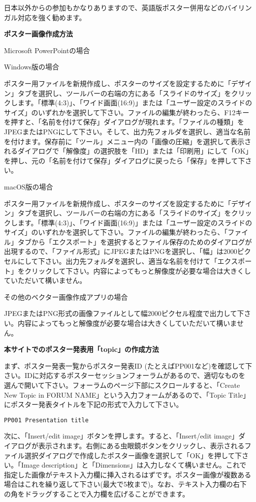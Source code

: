 \documentclass[titlepage,10pt,a4paper,uplatex]{jsbook}
\newenvironment{content}{\begin{shaded}\vspace{-1em}\raggedright\ttfamily\footnotesize\setlength{\baselineskip}{1.4em}}{\end{shaded}\vspace{-1em}}
\renewcommand{\textbf}[1]{{\bfseries\sffamily#1}}
\begin{document}
\begin{content}
日本以外からの参加もかなりありますので、英語版ポスター併用などのバイリンガル対応を強く勧めます。

\textbf{\Large ポスター画像作成方法}

{\Large Microsoft PowerPointの場合}

{\large Windows版の場合}

ポスター用ファイルを新規作成し、ポスターのサイズを設定するために「デザイン」タブを選択し、ツールバーの右端の方にある「スライドのサイズ」をクリックします。「標準(4:3)」、「ワイド画面(16:9)」または「ユーザー設定のスライドのサイズ」のいずれかを選択して下さい。ファイルの編集が終わったら、F12キーを押すと、「名前を付けて保存」ダイアログが現れます。「ファイルの種類」をJPEGまたはPNGにして下さい。そして、出力先フォルダを選択し、適当な名前を付けます。保存前に「ツール」メニュー内の「画像の圧縮」を選択して表示されるダイアログで「解像度」の選択肢を「HD」または「印刷用」にして「OK」を押し、元の「名前を付けて保存」ダイアログに戻ったら「保存」を押して下さい。

{\large macOS版の場合}

ポスター用ファイルを新規作成し、ポスターのサイズを設定するために「デザイン」タブを選択し、ツールバーの右端の方にある「スライドのサイズ」をクリックします。「標準(4:3)」、「ワイド画面(16:9)」または「ユーザー設定のスライドのサイズ」のいずれかを選択して下さい。ファイルの編集が終わったら、「ファイル」タブから「エクスポート」を選択するとファイル保存のためのダイアログが出現するので、「ファイル形式」にJPEGまたはPNGを選択し、「幅」は2000ピクセルにして下さい。出力先フォルダを選択し、適当な名前を付けて「エクスポート」をクリックして下さい。内容によってもっと解像度が必要な場合は大きくしていただいて構いません。

{\Large その他のベクター画像作成アプリの場合}

JPEGまたはPNG形式の画像ファイルとして幅2000ピクセル程度で出力して下さい。内容によってもっと解像度が必要な場合は大きくしていただいて構いません。

\textbf{\Large 本サイトでのポスター発表用「topic」の作成方法}

まず、ポスター発表一覧からポスター発表ID (たとえばPP001など)を確認して下さい。IDに対応するポスターセッションフォーラムがあるので、適切なものを選んで開いて下さい。フォーラムのページ下部にスクロールすると、「Create New Topic in FORUM NAME」という入力フォームがあるので、「Topic Title」にポスター発表タイトルを下記の形式で入力して下さい。

\texttt{PP001 Presentation title}

次に、「Insert/edit image」ボタンを押します。すると、「Insert/edit image」ダイアログが表示されます。右側にある虫眼鏡ボタンをクリックし、表示されるファイル選択ダイアログで作成したポスター画像を選択して「OK」を押して下さい。「Image description」と「Dimensions」は入力しなくて構いません。これで指定した画像がテキスト入力欄に挿入されるはずです。ポスター画像が複数ある場合はこれを繰り返して下さい(最大で5枚まで)。なお、テキスト入力欄の右下の角をドラッグすることで入力欄を広げることができます。


\end{content}
\end{document}
